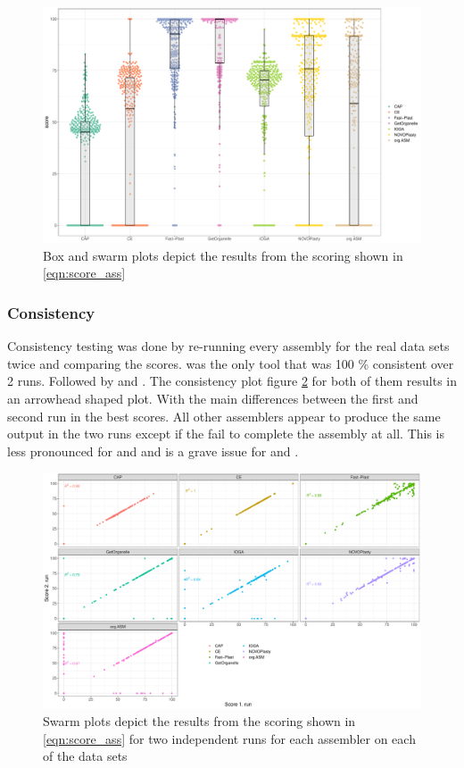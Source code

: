 \begin{figure}[H]
\centering
\includegraphics[height=.45\textheight, width=.95\textwidth]{Figures/swarm}
\decoRule
\caption[Scores of assemblies from real data sets]{Box and swarm plots depict the results from the scoring shown in \ref{eqn:score_ass}}
\label{fig:swarm}
\end{figure}



\subsubsection{Consistency}

Consistency testing was done by re-running every assembly for the real data sets twice and comparing the
scores. \ce was the only tool that was 100 \% consistent over 2 runs. Followed by \fp and \np. The consistency
plot figure \ref{fig:consisplot} for both of them results in an arrowhead shaped plot. With the main differences
between the first and second run in the best scores. All other assemblers appear to produce the same output in
the two runs except if the fail to complete the assembly at all. This is less pronounced for \cassp and \go
and is a grave issue for \oa and \ioga.

\begin{figure}[H]
\centering
\includegraphics[height=.45\textheight, width=.95\textwidth]{Figures/repro}
\decoRule
\caption[Comparison between two runs with the same assembler for consistency testing ]{Swarm plots depict the
  results from the scoring shown in \ref{eqn:score_ass} for two independent runs for each assembler on each of
  the data sets}
\label{fig:consisplot}
\end{figure}


